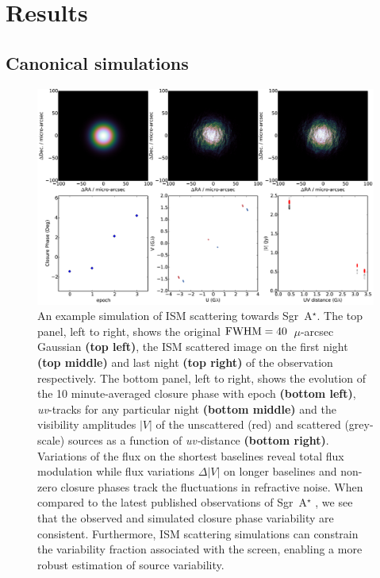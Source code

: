 \chapter{Results}

\section{Canonical simulations}\label{sec:can_sim}


\begin{figure}
\begin{center}
\includegraphics[width=\columnwidth]{Images/ism}
\caption{An example simulation of ISM scattering towards Sgr~A$^{\star}$.  The top panel, left to right, shows the original $\rm FWHM = 40$~$\mu$-arcsec Gaussian {\bf (top left)}, the ISM scattered image on the first night {\bf (top middle)} and last night {\bf (top right)} of the observation respectively.  The bottom panel, left to right,  shows the evolution of the 10 minute-averaged closure phase with epoch {\bf (bottom left)}, {\sl uv}-tracks for any particular night {\bf (bottom middle)} and the visibility amplitudes $|V|$ of the unscattered (red) and scattered (grey-scale) sources as a function of {\sl uv-}distance {\bf (bottom right)}. Variations of the flux on the shortest baselines reveal total flux modulation while flux variations $\Delta |V|$ on longer baselines and non-zero closure phases track the fluctuations in refractive noise. When compared to the latest published observations of Sgr~A$^{\star}$ \protect\citep{Fish_2016}, we see that the observed and simulated closure phase variability are consistent. Furthermore, ISM scattering simulations can constrain the variability fraction associated with the screen, enabling a more robust estimation of source variability.\label{ISM_sequence}%
}
\end{center}
\end{figure}

